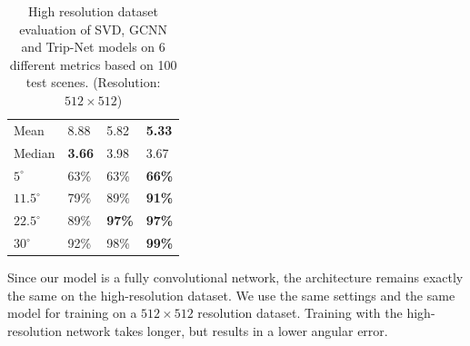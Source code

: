 \begin{table}[H]
	\centering
	\captionsetup{width=\linewidth}
	\begin{tabular}{l | l l l }
		\toprule
		\tabhead{Metrics} & \tabhead{SVD} & \tabhead{GCNN} & \tabhead{Trip-Net} \\
		\midrule
		Mean  					& 8.88 & 5.82 & \textbf{5.33} \\ 
		\hline
		Median					& \textbf{3.66} & 3.98 & 3.67 \\ 
		\hline
		$ 5^\circ $ 			& 63\% & 63\% & \textbf{66\%} \\
		\hline
		$ 11.5^\circ $ 			& 79\% & 89\% & \textbf{91\%} \\
		\hline
		$ 22.5^\circ $ 			& 89\% & \textbf{97\%} & \textbf{97\%} \\
		\hline
		$ 30^\circ $ 			& 92\% & 98\% & \textbf{99\%} \\
		\bottomrule
	\end{tabular}
	\caption{High resolution dataset evaluation of SVD, GCNN and Trip-Net models on 6 different metrics based on 100 test scenes. (Resolution: $ 512\times512 $)}	
	\label{tab:high_resolution_eval}
\end{table}

Since our model is a fully convolutional network, the architecture remains exactly the same on the high-resolution dataset. We use the same settings and the same model for training on a $ 512\times512 $ resolution dataset. Training with the high-resolution network takes longer, but results in a lower angular error. 



